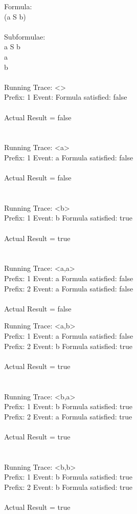 Formula:\\
(a S b)\\
\\
Subformulae:\\
a S b\\
a\\
b\\
\\
Running Trace: \textless \textgreater\\
  Prefix: 1 Event:  Formula satisfied: false\\
\\
Actual Result = false\\
\\
\\
Running Trace: \textless a\textgreater\\
  Prefix: 1 Event: a Formula satisfied: false\\
\\
Actual Result = false\\
\\
\\
Running Trace: \textless b\textgreater\\
  Prefix: 1 Event: b Formula satisfied: true\\
\\
Actual Result = true\\
\\
\\
Running Trace: \textless a,a\textgreater\\
  Prefix: 1 Event: a Formula satisfied: false\\
  Prefix: 2 Event: a Formula satisfied: false\\
\\
Actual Result = false\\

\newpage

\noindent Running Trace: \textless a,b\textgreater\\
  Prefix: 1 Event: a Formula satisfied: false\\
  Prefix: 2 Event: b Formula satisfied: true\\
\\
Actual Result = true\\
\\
\\
Running Trace: \textless b,a\textgreater\\
  Prefix: 1 Event: b Formula satisfied: true\\
  Prefix: 2 Event: a Formula satisfied: true\\
\\
Actual Result = true\\
\\
\\
Running Trace: \textless b,b\textgreater\\
  Prefix: 1 Event: b Formula satisfied: true\\
  Prefix: 2 Event: b Formula satisfied: true\\
\\
Actual Result = true\\
